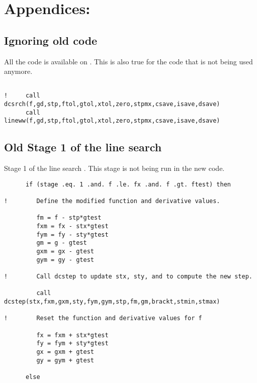 
\chapter{Appendices: } %

\label{AppendixA} %


\section{Ignoring old code}
All the code is available on \citep{lbfgsbNS} \label{ignoredcode}. This is also true for the code that is not being used anymore.
\begin{lstlisting}

!     call dcsrch(f,gd,stp,ftol,gtol,xtol,zero,stpmx,csave,isave,dsave)
      call lineww(f,gd,stp,ftol,gtol,xtol,zero,stpmx,csave,isave,dsave)

\end{lstlisting}

\lstset{
  firstnumber = 3687
}
\section{Old Stage 1 of the line search}
Stage 1 of the line search\citep{lbfgsbsoftware} \label{stage1}. This stage is not being run in the new code.
\begin{lstlisting}
      if (stage .eq. 1 .and. f .le. fx .and. f .gt. ftest) then

!        Define the modified function and derivative values.

         fm = f - stp*gtest
         fxm = fx - stx*gtest
         fym = fy - sty*gtest
         gm = g - gtest
         gxm = gx - gtest
         gym = gy - gtest

!        Call dcstep to update stx, sty, and to compute the new step.

         call dcstep(stx,fxm,gxm,sty,fym,gym,stp,fm,gm,brackt,stmin,stmax)

!        Reset the function and derivative values for f

         fx = fxm + stx*gtest
         fy = fym + sty*gtest
         gx = gxm + gtest
         gy = gym + gtest

      else
\end{lstlisting}

